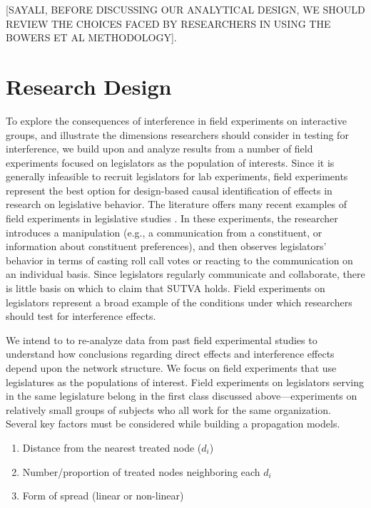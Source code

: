 \documentclass[12pt]{article}
\begin{document}
[SAYALI, BEFORE DISCUSSING OUR ANALYTICAL DESIGN, WE SHOULD REVIEW THE CHOICES FACED BY RESEARCHERS IN USING THE BOWERS ET AL METHODOLOGY].

\section{Research Design}

To explore the consequences of interference in field experiments on interactive groups, and illustrate the dimensions researchers should consider in testing for interference, we build upon \citet{coppock2014information} and analyze results from a number of field experiments focused on legislators as the population of interests. Since it is generally infeasible to recruit legislators for lab experiments, field experiments represent the best option for design-based causal identification of effects in research on legislative behavior. The literature offers many recent examples of field experiments in legislative studies \citep[e.g., ][]{bergan2009does,butler2011politicians,butler2012field,broockman2013black,nyhan2015effect,bergan2015call}. In these experiments, the researcher introduces a manipulation (e.g., a communication from a constituent, or information about constituent preferences), and then observes legislators' behavior in terms of casting roll call votes or reacting to the communication on an individual basis. Since legislators regularly communicate and collaborate, there is little basis on which to claim that SUTVA holds. Field experiments on legislators represent a broad example of the conditions under which researchers should test for interference effects.

  We intend to to re-analyze data from past field experimental studies to understand how conclusions regarding direct effects and interference effects depend upon the network structure. We focus on field experiments that use legislatures as the populations of interest. Field experiments on legislators serving in the same legislature belong in the first class discussed above---experiments on relatively small groups of subjects who all work for the same organization. Several key factors must be considered while building a propagation models.


\begin{enumerate}
\item Distance from the nearest treated node ($d_i$)
\item Number/proportion of treated nodes neighboring each $d_i$
\item Form of spread (linear or non-linear)
\end{enumerate}
\end{document}
